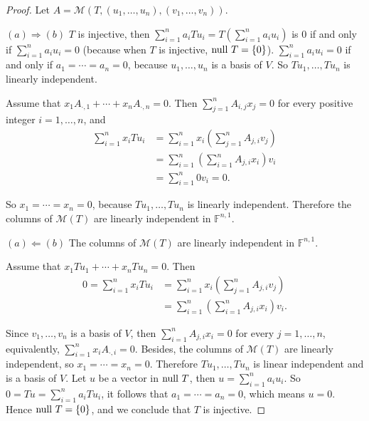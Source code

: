 \begin{proof}
    Let $A = \mathcal{M}(T, (u_{1}, \ldots, u_{n}), (v_{1}, \ldots, v_{n}))$.

    $(a) \Rightarrow (b)$ $T$ is injective, then $\sum^{n}_{i=1}a_{i}Tu_{i} = T(\sum^{n}_{i=1}a_{i}u_{i})$ is $0$ if and only if $\sum^{n}_{i=1}a_{i}u_{i} = 0$ (because when $T$ is injective, $\operatorname{null}\,{T} = \{0\}$). $\sum^{n}_{i=1}a_{i}u_{i} = 0$ if and only if $a_{1} = \cdots = a_{n} = 0$, because $u_{1}, \ldots, u_{n}$ is a basis of $V$. So $Tu_{1}, \ldots, Tu_{n}$ is linearly independent.

    Assume that $x_{1}A_{\cdot,1} + \cdots + x_{n}A_{\cdot,n} = 0$. Then $\sum^{n}_{j=1}A_{i,j}x_{j} = 0$ for every positive integer $i = 1, \ldots, n$, and
    \begin{align*}
        \sum^{n}_{i=1}x_{i}Tu_{i} & = \sum^{n}_{i=1}x_{i}\left(\sum^{n}_{j=1}A_{j,i}v_{j}\right)  \\
                                  & = \sum^{n}_{i=1} \left(\sum^{n}_{i=1}A_{j,i}x_{i}\right)v_{i} \\
                                  & = \sum^{n}_{i=1} 0v_{i} = 0.
    \end{align*}

    So $x_{1} = \cdots = x_{n} = 0$, because $Tu_{1}, \ldots, Tu_{n}$ is linearly independent. Therefore the columns of $\mathcal{M}(T)$ are linearly independent in $\mathbb{F}^{n,1}$.

    $(a) \Leftarrow (b)$ The columns of $\mathcal{M}(T)$ are linearly independent in $\mathbb{F}^{n,1}$.

    Assume that $x_{1}Tu_{1} + \cdots + x_{n}Tu_{n} = 0$. Then
    \begin{align*}
        0 = \sum^{n}_{i=1}x_{i}Tu_{i} & = \sum^{n}_{i=1}x_{i}\left(\sum^{n}_{j=1}A_{j,i}v_{j}\right)   \\
                                      & = \sum^{n}_{i=1} \left(\sum^{n}_{i=1}A_{j,i}x_{i}\right)v_{i}.
    \end{align*}

    Since $v_{1}, \ldots, v_{n}$ is a basis of $V$, then $\sum^{n}_{i=1}A_{j,i}x_{i} = 0$ for every $j = 1, \ldots, n$, equivalently, $\sum^{n}_{i=1}x_{i}A_{\cdot,i} = 0$. Besides, the columns of $\mathcal{M}(T)$ are linearly independent, so $x_{1} = \cdots = x_{n} = 0$. Therefore $Tu_{1}, \ldots, Tu_{n}$ is linear independent and is a basis of $V$. Let $u$ be a vector in $\operatorname{null}\,{T}$, then $u = \sum^{n}_{i=1}a_{i}u_{i}$. So $0 = Tu = \sum^{n}_{i=1}a_{i}Tu_{i}$, it follows that $a_{1} = \cdots = a_{n} = 0$, which means $u = 0$. Hence $\operatorname{null}\,{T} = \{0\}$, and we conclude that $T$ is injective.


\end{proof}
